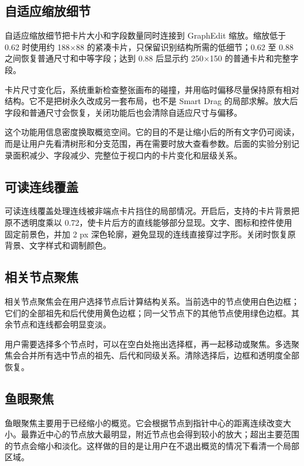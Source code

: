 \documentclass[11pt,a4paper,oneside,extrafontsizes]{memoir}
\begin{document}
\subsection{自适应缩放细节}

自适应缩放细节把卡片大小和字段数量同时连接到 GraphEdit 缩放。缩放低于 0.62 时使用约 188×88 的紧凑卡片，只保留识别结构所需的低细节；0.62 至 0.88 之间恢复普通尺寸和中等字段；达到 0.88 后显示约 250×150 的普通卡片和完整字段。

卡片尺寸变化后，系统重新检查整张画布的碰撞，并用临时偏移尽量保持原有相对结构。它不是把树永久改成另一套布局，也不是 Smart Drag 的局部求解。放大后字段和普通尺寸会恢复，关闭功能后也会清除自适应尺寸与偏移。

这个功能用信息密度换取概览空间。它的目的不是让缩小后的所有文字仍可阅读，而是让用户先看清树形和分支范围，再在需要时放大查看参数。后面的实验分别记录面积减少、字段减少、完整位于视口内的卡片变化和层级关系。

\subsection{可读连线覆盖}

可读连线覆盖处理连线被非端点卡片挡住的局部情况。开启后，支持的卡片背景把原不透明度乘以 0.72，使卡片后方的直线能够部分显现。文字、图标和控件使用固定前景色，并加 2 px 深色轮廓，避免显现的连线直接穿过字形。关闭时恢复原背景、文字样式和调制颜色。

\subsection{相关节点聚焦}

相关节点聚焦会在用户选择节点后计算结构关系。当前选中的节点使用白色边框；它们的全部祖先和后代使用黄色边框；同一父节点下的其他节点使用绿色边框。其余节点和连线都会明显变淡。

用户需要选择多个节点时，可以在空白处拖出选择框，再一起移动或聚焦。多选聚焦会合并所有选中节点的祖先、后代和同级关系。清除选择后，边框和透明度全部恢复。

\subsection{鱼眼聚焦}

鱼眼聚焦主要用于已经缩小的概览。它会根据节点到指针中心的距离连续改变大小。最靠近中心的节点放大最明显，附近节点也会得到较小的放大；超出主要范围的节点会缩小和淡化。这样做的目的是让用户在不退出概览的情况下看清一个局部区域。
\end{document}
